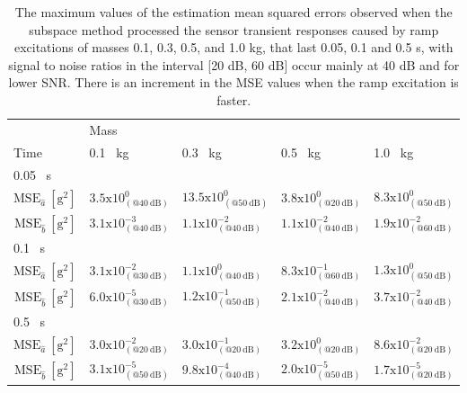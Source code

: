 \begin{table}[h!]
\centering
\caption{ The maximum values of the estimation mean squared errors observed when the subspace method processed the sensor transient responses caused by ramp excitations of masses 0.1, 0.3, 0.5, and 1.0 kg, that last 0.05, 0.1 and 0.5 s, with signal to noise ratios in the interval [20 dB, 60 dB] occur mainly at 40 dB and for lower SNR. There is an increment in the MSE values when the ramp excitation is faster.}
 
\begin{tabular}{l|l l l l} 
 \hline
 & Mass & \\ [0.5ex] 
 Time & 0.1 \ kg & 0.3 \ kg & 0.5 \ kg & 1.0 \ kg \\ 
 \hline
\multicolumn{1}{l|}{0.05 \ s} & \\
 \multicolumn{1}{r|}{\hspace{1mm} $\mathrm{MSE}_{\hat{a}} \ \mathrm{[g^2]}$} & $3.5\mathrm{x}10^{0}_{(@40 \ \mathrm{dB})}$ & $13.5\mathrm{x}10^{0}_{(@50 \ \mathrm{dB})}$ & $3.8\mathrm{x}10^{0}_{(@20 \ \mathrm{dB})}$ & $8.3\mathrm{x}10^{0}_{(@50 \ \mathrm{dB})}$ \\ 
\multicolumn{1}{r|}{\hspace{1mm} $\mathrm{MSE}_{\hat{b}} \ \mathrm{[g^2]}$} & $3.1\mathrm{x}10^{-3}_{(@40 \ \mathrm{dB})}$ & $1.1\mathrm{x}10^{-2}_{(@40 \ \mathrm{dB})}$ & $1.1\mathrm{x}10^{-2}_{(@40 \ \mathrm{dB})}$ & $1.9\mathrm{x}10^{-2}_{(@60 \ \mathrm{dB})}$ \\
\multicolumn{1}{l|}{0.1 \ s} & \\
 \multicolumn{1}{r|}{\hspace{1mm} $\mathrm{MSE}_{\hat{a}} \ \mathrm{[g^2]}$} & $3.1\mathrm{x}10^{-2}_{(@30 \ \mathrm{dB})}$ & $1.1\mathrm{x}10^{0}_{(@40 \ \mathrm{dB})}$ & $8.3\mathrm{x}10^{-1}_{(@60 \ \mathrm{dB})}$ & $1.3\mathrm{x}10^{0}_{(@50 \ \mathrm{dB})}$ \\
\multicolumn{1}{r|}{\hspace{1mm} $\mathrm{MSE}_{\hat{b}} \ \mathrm{[g^2]}$} & $6.0\mathrm{x}10^{-5}_{(@30 \ \mathrm{dB})}$ & $1.2\mathrm{x}10^{-1}_{(@50 \ \mathrm{dB})}$ & $2.1\mathrm{x}10^{-2}_{(@40 \ \mathrm{dB})}$ & $3.7\mathrm{x}10^{-2}_{(@40 \ \mathrm{dB})}$ \\
\multicolumn{1}{l|}{0.5 \ s} & \\
 \multicolumn{1}{r|}{\hspace{1mm} $\mathrm{MSE}_{\hat{a}} \ \mathrm{[g^2]}$} & $3.0\mathrm{x}10^{-2}_{(@20 \ \mathrm{dB})}$ & $3.0\mathrm{x}10^{-1}_{(@20 \ \mathrm{dB})}$ & $3.2\mathrm{x}10^{0}_{(@20 \ \mathrm{dB})}$ & $8.6\mathrm{x}10^{-2}_{(@20 \ \mathrm{dB})}$ \\
\multicolumn{1}{r|}{\hspace{1mm} $\mathrm{MSE}_{\hat{b}} \ \mathrm{[g^2]}$} & $3.1\mathrm{x}10^{-5}_{(@50 \ \mathrm{dB})}$ & $9.8\mathrm{x}10^{-4}_{(@40 \ \mathrm{dB})}$ & $2.0\mathrm{x}10^{-5}_{(@50 \ \mathrm{dB})}$ & $1.7\mathrm{x}10^{-5}_{(@20 \ \mathrm{dB})}$ \\ [0.5ex] %
 \hline
\end{tabular}
\label{table:differentmasses}
\end{table}


